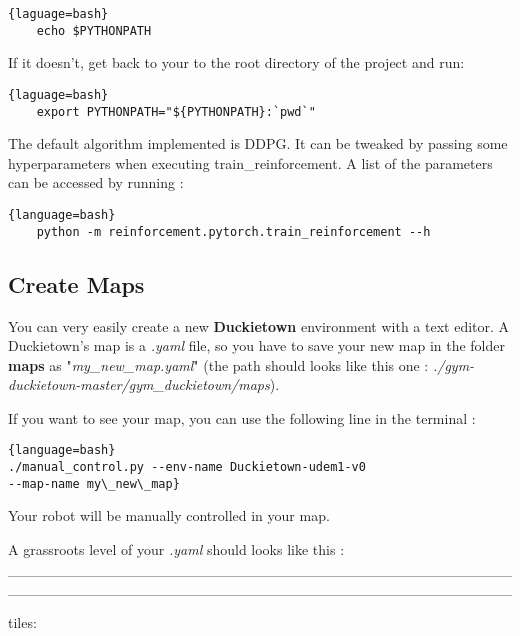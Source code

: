 \documentclass[12pt]{article}
\begin{document}
\begin{lstlisting}{laguage=bash}
    echo $PYTHONPATH
\end{lstlisting}

If it doesn't, get back to your to the root directory of the project and run: 

\begin{lstlisting}{laguage=bash}
    export PYTHONPATH="${PYTHONPATH}:`pwd`"
\end{lstlisting}

The default algorithm implemented is DDPG. It can be tweaked by passing some hyperparameters when executing train\_reinforcement. A list of the parameters can be accessed by running :

\begin{lstlisting}{language=bash}
    python -m reinforcement.pytorch.train_reinforcement --h
\end{lstlisting}

\subsection{Create Maps}
You can very easily create a new \textbf{Duckietown} environment with a text editor. A Duckietown's map is a \textit{.yaml} file, so you have to save your new map in the folder \textbf{maps} as "\textit{my\_new\_map.yaml}" (the path should looks like this one : \textit{./gym-duckietown-master/gym\_duckietown/maps}).
\newline

If you want to see your map, you can use the following line in the terminal : \newline

\begin{lstlisting}{language=bash}
./manual_control.py --env-name Duckietown-udem1-v0 
--map-name my\_new\_map}
\end{lstlisting}

\noindent Your robot will be manually controlled in your map.\newline


\noindent A grassroots level of your \textit{.yaml} should looks like this :\newline
\_\_\_\_\_\_\_\_\_\_\_\_\_\_\_\_\_\_\_\_\_\_\_\_\_\_\_\_\_\_\_\_\_\_\_\_\_\_\_\_\_\_\_\_\_\_\_\_\_\_\_\_\_\_\_\_\_\_\_\_\_\_\_\_\_\_\_\_\_\_\_\_\_\_\_\_\_\_\_\_\_\_\_\_\_\_\_\_\_\_\_\_\_\_\_\_

\noindent tiles:\newline
\end{document}
